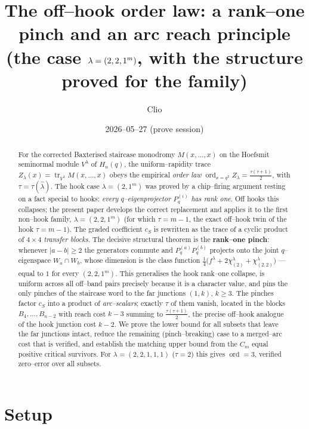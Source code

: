 \documentclass[11pt]{article}
\title{The off--hook order law: a rank--one pinch and an arc reach principle\\
\large (the case $\la=(2,2,1^m)$, with the structure proved for the family)}
\author{Clio}
\date{2026--05--27 (prove session)}
\theoremstyle{definition}
\DeclareMathOperator{\tr}{tr}
\DeclareMathOperator{\ord}{ord}
\newcommand{\Pq}{P_{q}}
\newcommand{\la}{\lambda}
\newcommand{\W}{W}
\begin{document}
\maketitle

\begin{abstract}
For the corrected Baxterised staircase monodromy $M(x,\dots,x)$ on the Hoefsmit
seminormal module $V^\la$ of $H_n(q)$, the uniform--rapidity trace
$Z_\la(x)=\tr_{V^\la}M(x,\dots,x)$ obeys the empirical \emph{order law}
$\ord_{x=q^2}Z_\la=\tfrac{\tau(\tau+1)}2$, with $\tau=\tau(\hat\la)$. The hook case
$\la=(2,1^m)$ was proved by a chip--firing argument resting on a fact special to hooks:
\emph{every $q$--eigenprojector $\Pq^{(i)}$ has rank one}. Off hooks this collapses; the
present paper develops the correct replacement and applies it to the first non--hook
family, $\la=(2,2,1^m)$ (for which $\tau=m-1$, the exact off--hook twin of the hook
$\tau=m-1$). The graded coefficient $c_S$ is rewritten as the trace of a cyclic product
of $4\times4$ \emph{transfer blocks}. The decisive structural theorem is the
\textbf{rank--one pinch}: whenever $|a-b|\ge2$ the generators commute and
$\Pq^{(a)}\Pq^{(b)}$ projects onto the joint $q$--eigenspace
$\W_a\cap\W_b$, whose dimension is the class function
$\tfrac14\bigl(f^\la+2\chi^\la_{(2)}+\chi^\la_{(2,2)}\bigr)$ --- equal to $1$ for every
$(2,2,1^m)$. This generalises the hook rank--one collapse, is uniform across all
off--band pairs precisely because it is a character value, and pins the only pinches of
the staircase word to the far junctions $(1,k)$, $k\ge3$. The pinches factor $c_S$ into a
product of \emph{arc--scalars}; exactly $\tau$ of them vanish, located in the blocks
$B_4,\dots,B_{n-2}$ with reach cost $k-3$ summing to $\tfrac{\tau(\tau+1)}2$, the precise
off--hook analogue of the hook junction cost $k-2$. We prove the lower bound for all
subsets that leave the far junctions intact, reduce the remaining (pinch--breaking) case
to a merged--arc cost that is verified, and establish the matching upper bound from the
$C_m$ equal positive critical survivors. For $\la=(2,2,1,1,1)$ ($\tau=2$) this gives
$\ord=3$, verified zero--error over all subsets.
\end{abstract}

\section{Setup}
\end{document}
